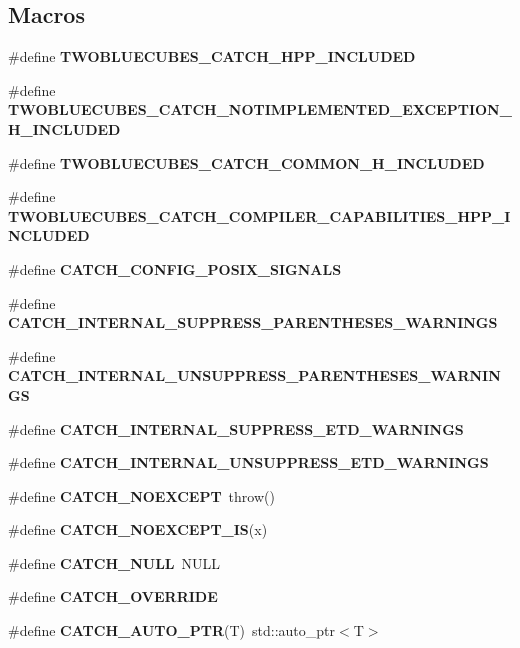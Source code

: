 \subsection*{Macros}
\begin{DoxyCompactItemize}
\item 
\#define \textbf{ T\+W\+O\+B\+L\+U\+E\+C\+U\+B\+E\+S\+\_\+\+C\+A\+T\+C\+H\+\_\+\+H\+P\+P\+\_\+\+I\+N\+C\+L\+U\+D\+ED}
\item 
\#define \textbf{ T\+W\+O\+B\+L\+U\+E\+C\+U\+B\+E\+S\+\_\+\+C\+A\+T\+C\+H\+\_\+\+N\+O\+T\+I\+M\+P\+L\+E\+M\+E\+N\+T\+E\+D\+\_\+\+E\+X\+C\+E\+P\+T\+I\+O\+N\+\_\+\+H\+\_\+\+I\+N\+C\+L\+U\+D\+ED}
\item 
\#define \textbf{ T\+W\+O\+B\+L\+U\+E\+C\+U\+B\+E\+S\+\_\+\+C\+A\+T\+C\+H\+\_\+\+C\+O\+M\+M\+O\+N\+\_\+\+H\+\_\+\+I\+N\+C\+L\+U\+D\+ED}
\item 
\#define \textbf{ T\+W\+O\+B\+L\+U\+E\+C\+U\+B\+E\+S\+\_\+\+C\+A\+T\+C\+H\+\_\+\+C\+O\+M\+P\+I\+L\+E\+R\+\_\+\+C\+A\+P\+A\+B\+I\+L\+I\+T\+I\+E\+S\+\_\+\+H\+P\+P\+\_\+\+I\+N\+C\+L\+U\+D\+ED}
\item 
\#define \textbf{ C\+A\+T\+C\+H\+\_\+\+C\+O\+N\+F\+I\+G\+\_\+\+P\+O\+S\+I\+X\+\_\+\+S\+I\+G\+N\+A\+LS}
\item 
\#define \textbf{ C\+A\+T\+C\+H\+\_\+\+I\+N\+T\+E\+R\+N\+A\+L\+\_\+\+S\+U\+P\+P\+R\+E\+S\+S\+\_\+\+P\+A\+R\+E\+N\+T\+H\+E\+S\+E\+S\+\_\+\+W\+A\+R\+N\+I\+N\+GS}
\item 
\#define \textbf{ C\+A\+T\+C\+H\+\_\+\+I\+N\+T\+E\+R\+N\+A\+L\+\_\+\+U\+N\+S\+U\+P\+P\+R\+E\+S\+S\+\_\+\+P\+A\+R\+E\+N\+T\+H\+E\+S\+E\+S\+\_\+\+W\+A\+R\+N\+I\+N\+GS}
\item 
\#define \textbf{ C\+A\+T\+C\+H\+\_\+\+I\+N\+T\+E\+R\+N\+A\+L\+\_\+\+S\+U\+P\+P\+R\+E\+S\+S\+\_\+\+E\+T\+D\+\_\+\+W\+A\+R\+N\+I\+N\+GS}
\item 
\#define \textbf{ C\+A\+T\+C\+H\+\_\+\+I\+N\+T\+E\+R\+N\+A\+L\+\_\+\+U\+N\+S\+U\+P\+P\+R\+E\+S\+S\+\_\+\+E\+T\+D\+\_\+\+W\+A\+R\+N\+I\+N\+GS}
\item 
\#define \textbf{ C\+A\+T\+C\+H\+\_\+\+N\+O\+E\+X\+C\+E\+PT}~throw()
\item 
\#define \textbf{ C\+A\+T\+C\+H\+\_\+\+N\+O\+E\+X\+C\+E\+P\+T\+\_\+\+IS}(x)
\item 
\#define \textbf{ C\+A\+T\+C\+H\+\_\+\+N\+U\+LL}~N\+U\+LL
\item 
\#define \textbf{ C\+A\+T\+C\+H\+\_\+\+O\+V\+E\+R\+R\+I\+DE}
\item 
\#define \textbf{ C\+A\+T\+C\+H\+\_\+\+A\+U\+T\+O\+\_\+\+P\+TR}(T)~std\+::auto\+\_\+ptr$<$T$>$

\end{DoxyCompactItemize}
